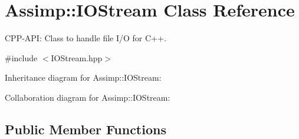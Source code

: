 \hypertarget{class_assimp_1_1_i_o_stream}{\section{Assimp\-:\-:I\-O\-Stream Class Reference}
\label{class_assimp_1_1_i_o_stream}
}


C\-P\-P-\/\-A\-P\-I\-: Class to handle file I/\-O for C++.  




{\ttfamily \#include $<$I\-O\-Stream.\-hpp$>$}



Inheritance diagram for Assimp\-:\-:I\-O\-Stream\-:


Collaboration diagram for Assimp\-:\-:I\-O\-Stream\-:
\subsection*{Public Member Functions}
